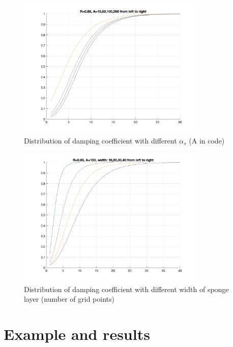 \documentclass[preprint,10pt]{elsarticle}
\begin{document}
 \begin{figure}
\begin{center}
 \includegraphics[width=0.8\textwidth]{figures/test_sponge_A.jpg}
 \caption{Distribution of damping coefficient with different $\alpha_s$ (A in code) }
 \label{A}
 \end{center}
 \end{figure}  
 
  \begin{figure}
\begin{center}
 \includegraphics[width=0.8\textwidth]{figures/test_sponge_width.jpg}
 \caption{Distribution of damping coefficient with different width of sponge layer (number of grid points) }
 \label{width}
 \end{center}
 \end{figure}  
   
\section{Example and results}
\end{document}
